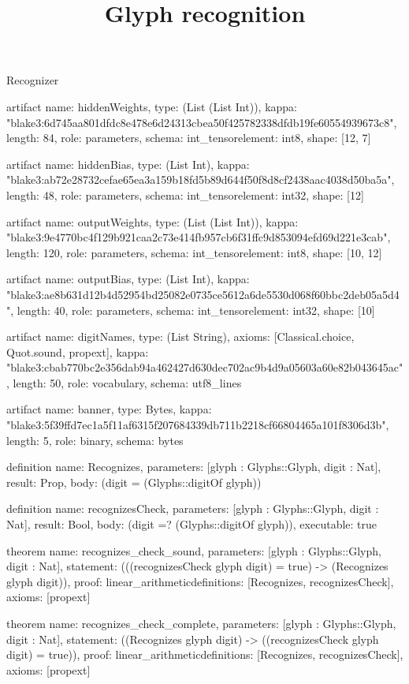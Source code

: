 \begin{lexlean}{Recognizer}
\title{Glyph recognition}
\begin{semanticmodule}
artifact{
  name: hiddenWeights,
  type: (List (List Int)),
  kappa: "blake3:6d745aa801dfdc8e478e6d24313cbea50f425782338dfdb19fe60554939673c8",
  length: 84,
  role: parameters,
  schema: int_tensor{element: int8, shape: [12, 7]}
}

artifact{
  name: hiddenBias,
  type: (List Int),
  kappa: "blake3:ab72e28732cefae65ea3a159b18fd5b89d644f50f8d8cf2438aac4038d50ba5a",
  length: 48,
  role: parameters,
  schema: int_tensor{element: int32, shape: [12]}
}

artifact{
  name: outputWeights,
  type: (List (List Int)),
  kappa: "blake3:9e4770bc4f129b921caa2c73e414fb957cb6f31ffc9d853094efd69d221e3cab",
  length: 120,
  role: parameters,
  schema: int_tensor{element: int8, shape: [10, 12]}
}

artifact{
  name: outputBias,
  type: (List Int),
  kappa: "blake3:ae8b631d12b4d52954bd25082e0735ce5612a6de5530d068f60bbc2deb05a5d4",
  length: 40,
  role: parameters,
  schema: int_tensor{element: int32, shape: [10]}
}

artifact{
  name: digitNames,
  type: (List String),
  axioms: [Classical.choice, Quot.sound, propext],
  kappa: "blake3:cbab770bc2e356dab94a462427d630dec702ac9b4d9a05603a60e82b043645ac",
  length: 50,
  role: vocabulary,
  schema: utf8_lines{}
}

artifact{
  name: banner,
  type: Bytes,
  kappa: "blake3:5f39ffd7ec1a5f11af6315f207684339db711b2218cf66804465a101f8306d3b",
  length: 5,
  role: binary,
  schema: bytes{}
}

definition{
  name: Recognizes,
  parameters: [glyph : Glyphs::Glyph, digit : Nat],
  result: Prop,
  body: (digit = (Glyphs::digitOf glyph))
}

definition{
  name: recognizesCheck,
  parameters: [glyph : Glyphs::Glyph, digit : Nat],
  result: Bool,
  body: (digit =? (Glyphs::digitOf glyph)),
  executable: true
}

theorem{
  name: recognizes_check_sound,
  parameters: [glyph : Glyphs::Glyph, digit : Nat],
  statement: (((recognizesCheck glyph digit) = true) -> (Recognizes glyph digit)),
  proof: linear_arithmetic{definitions: [Recognizes, recognizesCheck]},
  axioms: [propext]
}

theorem{
  name: recognizes_check_complete,
  parameters: [glyph : Glyphs::Glyph, digit : Nat],
  statement: ((Recognizes glyph digit) -> ((recognizesCheck glyph digit) = true)),
  proof: linear_arithmetic{definitions: [Recognizes, recognizesCheck]},
  axioms: [propext]
}


\end{semanticmodule}
\end{lexlean}

